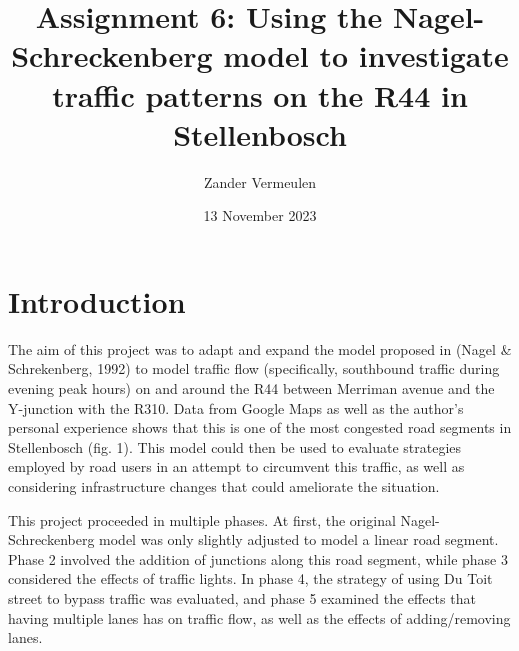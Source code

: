 \documentclass{article}
\title{Assignment 6: Using the Nagel-Schreckenberg model to investigate traffic patterns on the R44 in Stellenbosch}
\author{Zander Vermeulen}
\date{13 November 2023}
\begin{document}
\maketitle

\section*{Introduction}

The aim of this project was to adapt and expand the model proposed in (Nagel \& Schrekenberg, 1992) to model traffic flow (specifically, southbound traffic during evening peak hours) on and around the R44 between Merriman avenue and the Y-junction with the R310. Data from Google Maps as well as the author's personal experience shows that this is one of the most congested road segments in Stellenbosch (fig. 1). This model could then be used to evaluate strategies employed by road users in an attempt to circumvent this traffic, as well as considering infrastructure changes that could ameliorate the situation.

This project proceeded in multiple phases. At first, the original Nagel-Schreckenberg model was only slightly adjusted to model a linear road segment. Phase 2 involved the addition of junctions along this road segment, while phase 3 considered the effects of traffic lights. In phase 4, the strategy of using Du Toit street to bypass traffic was evaluated, and phase 5 examined the effects that having multiple lanes has on traffic flow, as well as the effects of adding/removing lanes.
\end{document}
